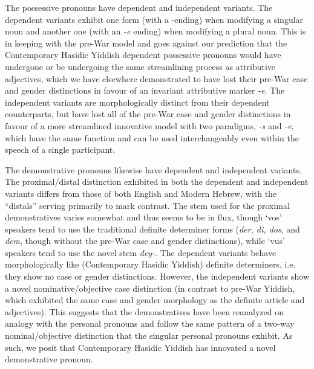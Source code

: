 \documentclass[output=paper, hidelinks]{langscibook}
\begin{document}
The possessive pronouns have dependent and independent variants. The dependent variants exhibit one form (with a \varnothing-ending) when modifying a singular noun and another one (with an \textit{-e} ending) when modifying a plural noun. This is in keeping with the pre-War model and goes against our prediction that the Contemporary Hasidic Yiddish dependent possessive pronouns would have undergone or be undergoing the same streamlining process as attributive adjectives, which we have elsewhere \citep{Author20, Author21} demonstrated to have lost their pre-War case and gender distinctions in favour of an invariant attributive marker \textit{-e}. The independent variants are morphologically distinct from their dependent counterparts, but have lost all of the pre-War case and gender distinctions in favour of a more streamlined innovative model with two paradigms, \textit{-s} and \textit{-e}, which have the same function and can be used interchangeably even within the speech of a single participant. 

The demonstrative pronouns likewise have dependent and independent variants. The proximal/distal distinction exhibited in both the dependent and independent variants differs from those of both English and Modern Hebrew, with the ``distals'' serving primarily to mark contrast. The stem used for the proximal demonstratives varies somewhat and thus seems to be in flux, though `vos’ speakers tend to use the traditional definite determiner forms (\textit{der, di, dos}, and \textit{dem}, though without the pre-War case and gender distinctions), while `vus’ speakers tend to use the novel stem \textit{dey-}. The dependent variants behave morphologically like (Contemporary Hasidic Yiddish) definite determiners, i.e. they show no case or gender distinctions. However, the independent variants show a novel nominative/objective case distinction (in contrast to pre-War Yiddish, which exhibited the same case and gender morphology as the definite article and adjectives). This suggests that the demonstratives have been reanalyzed on analogy with the personal pronouns and follow the same pattern of a two-way nominal/objective distinction that the singular personal pronouns exhibit. As such, we posit that Contemporary Hasidic Yiddish has innovated a novel demonstrative pronoun. 
\end{document}
